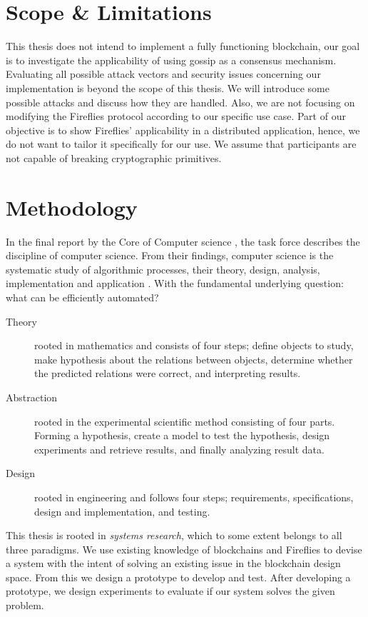 \documentclass[USenglish]{uit-thesis}
\begin{document}
\section{Scope \& Limitations}
This thesis does not intend to implement a fully functioning blockchain, our goal is to investigate the applicability of using gossip as a consensus mechanism.
Evaluating all possible attack vectors and security issues concerning our implementation is beyond the scope of this thesis.
We will introduce some possible attacks and discuss how they are handled. 
Also, we are not focusing on modifying the Fireflies protocol according to our specific use case.
Part of our objective is to show Fireflies' applicability in a distributed application, hence, we do not want to tailor it specifically for our use. 
We assume that participants are not capable of breaking cryptographic primitives.



\section{Methodology}
In the final report by the Core of Computer science \cite{methodology}, the task force describes the discipline of computer science.
From their findings, computer science is the systematic study of algorithmic processes, their theory, design, analysis, implementation and application \cite{methodology}.
With the fundamental underlying question: what can be efficiently automated?
\begin{description}
\item[Theory] rooted in mathematics and consists of four steps; define objects to study, make hypothesis about the relations between objects, determine whether the predicted relations were correct, and interpreting results.  
\item[Abstraction] rooted in the experimental scientific method consisting of four parts. 
Forming a hypothesis, create a model to test the hypothesis, design experiments and retrieve results, and finally analyzing result data.	
\item[Design] rooted in engineering and follows four steps; requirements, specifications, design and implementation, and testing. 
\end{description}
This thesis is rooted in \textit{systems research}, which to some extent belongs to all three paradigms. 
We use existing knowledge of blockchains and Fireflies to devise a system with the intent of solving an existing issue in the blockchain design space. 
From this we design a prototype to develop and test.
After developing a prototype, we design experiments to evaluate if our system solves the given problem.
\end{document}
